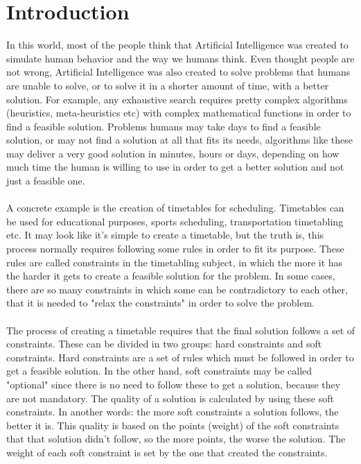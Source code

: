 \chapter{Introduction}
\label{introduction}
\thispagestyle{plain}

In this world, most of the people think that Artificial Intelligence was created to simulate human behavior and the way we humans think. Even thought people are not wrong, Artificial Intelligence was also created to solve problems that humans are unable to solve, or to solve it in a shorter amount of time, with a better solution. For example, any exhaustive search requires pretty complex algorithms (heuristics, meta-heuristics etc) with complex mathematical functions in order to find a feasible solution. Problems humans may take days to find a feasible solution, or may not find a solution at all that fits its needs, algorithms like these may deliver a very good solution in minutes, hours or days, depending on how much time the human is willing to use in order to get a better solution and not just a feasible one. \\
\\
A concrete example is the creation of timetables for scheduling. Timetables can be used for educational purposes, sports scheduling, transportation timetabling etc. It may look like it's simple to create a timetable, but the truth is, this process normally requires following some rules in order to fit its purpose. These rules are called constraints in the timetabling subject, in which the more it has the harder it gets to create a feasible solution for the problem. In some cases, there are so many constraints in which some can be contradictory to each other, that it is needed to "relax the constraints" in order to solve the problem. \\
\\
The process of creating a timetable requires that the final solution follows a set of constraints. These can be divided in two groups: hard constraints and soft constraints. Hard constraints are a set of rules which must be followed in order to get a feasible solution. In the other hand, soft constraints may be called "optional" since there is no need to follow these to get a solution, because they are not mandatory. The quality of a solution is calculated by using these soft constraints. In another words: the more soft constraints a solution follows, the better it is. This quality is based on the points (weight) of the soft constraints that that solution didn't follow, so the more points, the worse the solution. The weight of each soft constraint is set by the one that created the constraints. \\
